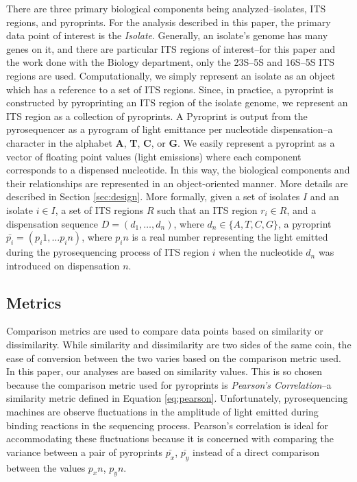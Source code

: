 \documentclass[12pt]{ucthesis}
\begin{document}
      There are three primary biological components being analyzed--isolates,
      ITS regions, and pyroprints. For the analysis described in this paper,
      the primary data point of interest is the \textit{Isolate}. Generally,
      an isolate's genome has many genes on it, and there are particular
      ITS regions of interest--for this paper and the work done with the
      Biology department, only the 23S--5S and 16S--5S ITS regions are used.
      Computationally, we simply represent an isolate as an object
      which has a reference to a set of ITS regions. Since, in practice, a
      pyroprint is constructed by pyroprinting an ITS region of the isolate
      genome, we represent an ITS region as a collection of pyroprints. A
      Pyroprint is output from the pyrosequencer as a pyrogram of light
      emittance per nucleotide dispensation--a character in the alphabet
      \textbf{A}, \textbf{T}, \textbf{C}, or \textbf{G}. We easily represent a
      pyroprint as a vector of floating point values (light emissions) where
      each component corresponds to a dispensed nucleotide. In this way, the
      biological components and their relationships are represented in an
      object-oriented manner. More details are described in Section
      \ref{sec:design}. More formally, given a set of isolates $I$ and an
      isolate $i \in I$, a set of ITS regions $R$ such that an ITS region $r_i
      \in R$, and a dispensation sequence $D = (d_1, \ldots, d_n)$, where $d_n
      \in \{A, T, C, G\}$, a pyroprint $\bar{p_i} = (p_i1,\ldots p_in)$, where
      $p_in$ is a real number representing the light emitted during the
      pyrosequencing process of ITS region $i$ when the nucleotide $d_n$ was
      introduced on dispensation $n$.
      
      \subsection{Metrics}
      Comparison metrics are used to compare data points based on similarity
      or dissimilarity. While similarity and dissimilarity are two sides of
      the same coin, the ease of conversion between the two varies based on
      the comparison metric used. In this paper, our analyses are based on
      similarity values. This is so chosen because the comparison metric used
      for pyroprints is \textit{Pearson's Correlation}--a similarity metric
      defined in Equation \ref{eq:pearson}. Unfortunately, pyrosequencing machines
      are observe fluctuations in the amplitude of light emitted
      during binding reactions in the sequencing process. Pearson's correlation
      is ideal for accommodating these fluctuations because it is
      concerned with comparing the variance between a pair of pyroprints
      $\bar{p_x}$, $\bar{p_y}$ instead of a direct comparison between the
      values $p_xn$, $p_yn$.
\end{document}
